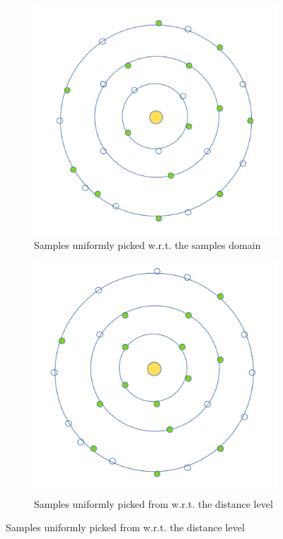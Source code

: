 \begin{figure}
	\begin{center}
		\begin{subfigure}[b]{0.48\textwidth}
			\includegraphics[width=\textwidth]{figures/SampleDistrUnifOverDomain.png}
			\caption{Samples uniformly picked w.r.t. the samples domain}
		\end{subfigure}
		\begin{subfigure}[b]{0.48\textwidth}
			\includegraphics[width=\textwidth]{figures/SampleDistrOverLeveDist.png}
			\caption{Samples uniformly picked from w.r.t. the distance level}
		\end{subfigure}


\end{center}
\end{figure}
